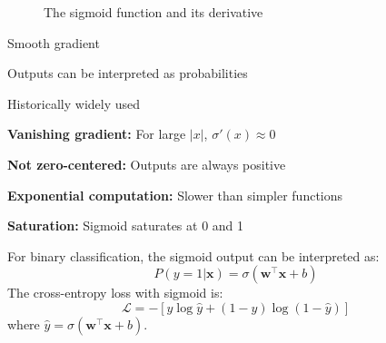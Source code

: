 \begin{figure}[h]
    \centering
    \caption[Sigmoid function and its derivative]{The sigmoid function and its derivative}
    \label{fig:sigmoid}
\end{figure}

\begin{advantages}
    \item Smooth gradient
    \item Outputs can be interpreted as probabilities
    \item Historically widely used
\end{advantages}

\begin{disadvantages}
    \item \textbf{Vanishing gradient:} For large $|x|$, $\sigma'(x) \approx 0$
    \item \textbf{Not zero-centered:} Outputs are always positive
    \item \textbf{Exponential computation:} Slower than simpler functions
    \item \textbf{Saturation:} Sigmoid saturates at 0 and 1
\end{disadvantages}

\begin{example}
For binary classification, the sigmoid output can be interpreted as:
\begin{equation}
P(y=1|\mathbf{x}) = \sigma(\mathbf{w}^\top \mathbf{x} + b)
\end{equation}
The cross-entropy loss with sigmoid is:
\begin{equation}
\mathcal{L} = -[y \log \hat{y} + (1-y) \log(1-\hat{y})]
\end{equation}
where $\hat{y} = \sigma(\mathbf{w}^\top \mathbf{x} + b)$.
\end{example}

